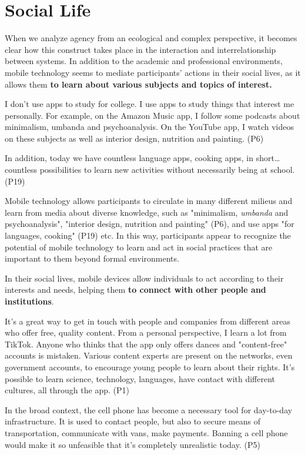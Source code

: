 \section{Social Life}

When we analyze agency from an ecological and complex perspective, it
becomes clear how this construct takes place in the interaction and
interrelationship between systems. In addition to the academic and
professional environments, mobile technology seems to mediate
participants' actions in their social lives, as it
allows them \textbf{to learn about various subjects and topics of
interest.}

I don't use apps to study for college. I use apps to
study things that interest me personally. For example, on the Amazon
Music app, I follow some podcasts about minimalism, umbanda and
psychoanalysis. On the YouTube app, I watch videos on these subjects as
well as interior design, nutrition and painting. (P6)

In addition, today we have countless language apps, cooking apps, in
short\ldots{} countless possibilities to learn new activities without
necessarily being at school. (P19)

Mobile technology allows participants to circulate in many different
milieus and learn from media about diverse knowledge, such as
"minimalism, \emph{umbanda} and psychoanalysis", "interior design,
nutrition and painting" (P6), and use apps "for languages, cooking"
(P19) etc. In this way, participants appear to recognize the potential
of mobile technology to learn and act in social practices that are
important to them beyond formal environments.

In their social lives, mobile devices allow individuals to act according
to their interests and needs, helping them \textbf{to connect with other
people and institutions}.

It's a great way to get in touch with people and
companies from different areas who offer free, quality content. From a
personal perspective, I learn a lot from TikTok. Anyone who thinks that
the app only offers dances and "content-free" accounts is mistaken.
Various content experts are present on the networks, even government
accounts, to encourage young people to learn about their rights.
It's possible to learn science, technology, languages,
have contact with different cultures, all through the app. (P1)

In the broad context, the cell phone has become a necessary tool for
day-to-day infrastructure. It is used to contact people, but also to
secure means of transportation, communicate with vans, make payments.
Banning a cell phone would make it so unfeasible that
it's completely unrealistic today. (P5)


